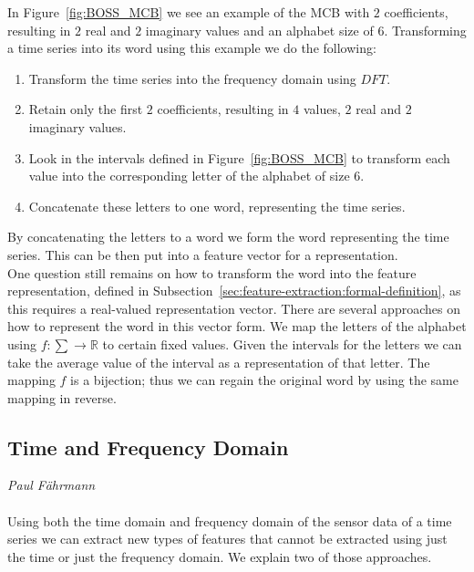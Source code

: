 In Figure~\ref{fig:BOSS_MCB} we see an example of the MCB with $2$ coefficients, resulting in $2$ real and $2$ imaginary values and an alphabet size of $6$. Transforming a time series into its word using this example we do the following:
\begin{enumerate}
	\item Transform the time series into the frequency domain using $DFT$.
	\item Retain only the first $2$ coefficients, resulting in $4$ values, $2$ real and $2$ imaginary values.
	\item Look in the intervals defined in Figure~\ref{fig:BOSS_MCB} to transform each value into the corresponding letter of the alphabet of size $6$.
	\item Concatenate these letters to one word, representing the time series.
\end{enumerate}
By concatenating the letters to a word we form the word representing the time series. This can be then put into a feature vector for a representation.\\
One question still remains on how to transform the word into the feature representation, defined in Subsection~\ref{sec:feature-extraction:formal-definition}, as this requires a real-valued representation vector.
There are several approaches on how to represent the word in this vector form. We map the letters of the alphabet using $f : \sum \rightarrow \mathbb{R}$ to certain fixed values. Given the intervals for the letters we can take the average value of the interval as a representation of that letter. The mapping $f$ is a bijection; thus we can regain the original word by using the same mapping in reverse.
\subsection{Time and Frequency Domain}
\vspace*{-15mm}
\hfill{\normalsize\emph{Paul Fährmann}}
\label{sec:feature-extraction:approaches:time-frequency-domain}
\\\\
Using both the time domain and frequency domain of the sensor data of a time series we can extract new types of features that cannot be extracted using just the time or just the frequency domain. We explain two of those approaches.

